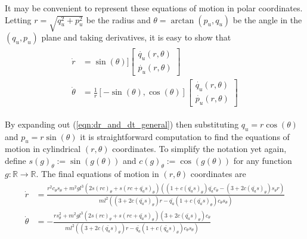 It may be convenient to represent these equations of motion  in polar coordinates.
Letting \(r = \sqrt{q_u^2 + p_u^2}\) be the radius and 
\(\theta = \arctan(p_u,q_u)\) be the angle in the \((q_u,p_u)\) plane and taking
derivatives, it is easy to show that
\begin{align}\label{eqn:dr_and_dt_general}
\begin{split}
    \dot{r} &= \sin(\theta)]
    \begin{bmatrix} \dot{q_u}(r,\theta) \\ \dot{p_u}(r,\theta) \end{bmatrix} \\
    \dot{\theta} &= \frac{1}{r}[-\sin(\theta), \cos(\theta)]
    \begin{bmatrix} \dot{q_u}(r,\theta) \\ \dot{p_u}(r,\theta) \end{bmatrix}
\end{split}
\end{align}

By expanding out (\ref{eqn:dr_and_dt_general}) then substituting \(q_u = r\cos(\theta)\)
and \(p_u = r\sin(\theta)\)
it is straightforward computation to find the equations of motion in cylindrical \((r,\theta)\)
coordinates. To simplify the notation yet again, define
\(s(g)_\theta := \sin(g(\theta))\) and \(c(g)_\theta := \cos(g(\theta))\) 
for any function \(g: \mathbb{R} \rightarrow \mathbb{R}\). The final equations
of motion in \((r,\theta)\) coordinates are
\begin{align}\label{eqn:acrobot_eom_rt}
\begin{split}
    \dot{r} &= \frac
    {
        r^2 c_\theta s_\theta 
        + m^2 g l^3 (2 s(rc)_\theta + s(rc + \bar{q_a}s)_\theta)
        \left(
            (1+c(\bar{q_a}s)_\theta)\bar{q_a}c_\theta 
            - (3 + 2c(\bar{q_a}s)_\theta)s_\theta r
        \right)
    }
    {
        m l^2 \left((3+2c(\bar{q_a}s)_\theta)r 
        - \bar{q_a}(1+ c(\bar{q_a}s)_\theta)c_\theta s_\theta\right)
    }\\
    \dot{\theta} &= -\frac
    {
        r s_\theta^2
        + m^2 g l^3 (2 s(rc)_\theta + s(rc + \bar{q_a}s)_\theta)
        (3 + 2c(\bar{q_a}s)_\theta)c_\theta
    }
    {
        m l^2 \left((3+2c(\bar{q_a}s)_\theta)r 
        - \bar{q_a}(1+ c(\bar{q_a}s)_\theta)c_\theta s_\theta\right)
    }
\end{split}
\end{align}

